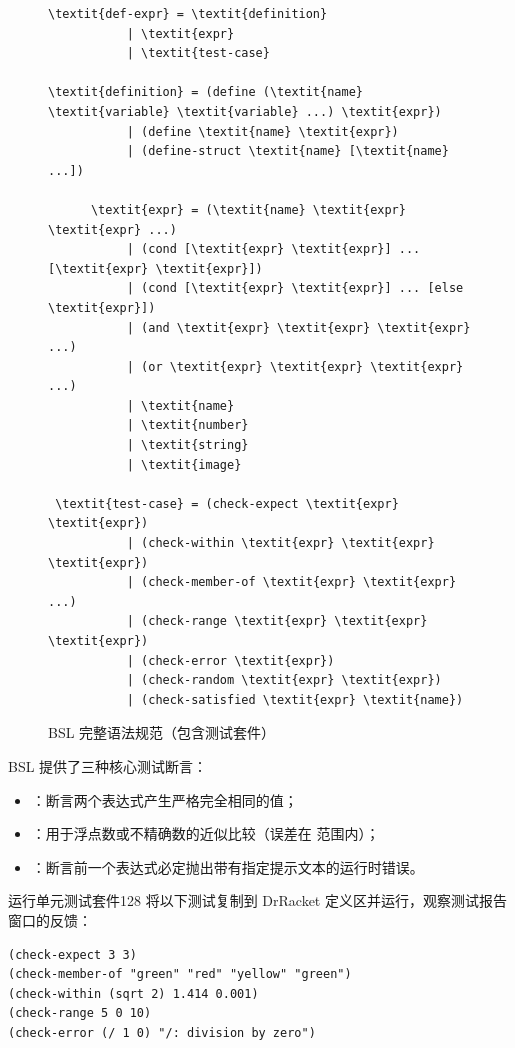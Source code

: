 \begin{figure}[htbp]
  \centering
\begin{stepperbox}[unbreakable]
\begin{Verbatim}[commandchars=\\\{\}, fontsize=\scriptsize]
  \textit{def-expr} = \textit{definition}
           | \textit{expr}
           | \textit{test-case}

\textit{definition} = (define (\textit{name} \textit{variable} \textit{variable} ...) \textit{expr})
           | (define \textit{name} \textit{expr})
           | (define-struct \textit{name} [\textit{name} ...])

      \textit{expr} = (\textit{name} \textit{expr} \textit{expr} ...)
           | (cond [\textit{expr} \textit{expr}] ... [\textit{expr} \textit{expr}])
           | (cond [\textit{expr} \textit{expr}] ... [else \textit{expr}])
           | (and \textit{expr} \textit{expr} \textit{expr} ...)
           | (or \textit{expr} \textit{expr} \textit{expr} ...)
           | \textit{name}
           | \textit{number}
           | \textit{string}
           | \textit{image}

 \textit{test-case} = (check-expect \textit{expr} \textit{expr})
           | (check-within \textit{expr} \textit{expr} \textit{expr})
           | (check-member-of \textit{expr} \textit{expr} ...)
           | (check-range \textit{expr} \textit{expr} \textit{expr})
           | (check-error \textit{expr})
           | (check-random \textit{expr} \textit{expr})
           | (check-satisfied \textit{expr} \textit{name})
\end{Verbatim}
\end{stepperbox}
  \caption{BSL 完整语法规范（包含测试套件）}
  \label{fig:bsl_full_grammar}
\end{figure}

BSL 提供了三种核心测试断言：
\begin{itemize}
  \item {}：断言两个表达式产生严格完全相同的值；
  \item {}：用于浮点数或不精确数的近似比较（误差在  范围内）；
  \item {}：断言前一个表达式必定抛出带有指定提示文本的运行时错误。
\end{itemize}

\begin{exercise}{运行单元测试套件}{128}
将以下测试复制到 DrRacket 定义区并运行，观察测试报告窗口的反馈：
\begin{lstlisting}[language=BSL]
(check-expect 3 3)
(check-member-of "green" "red" "yellow" "green")
(check-within (sqrt 2) 1.414 0.001)
(check-range 5 0 10)
(check-error (/ 1 0) "/: division by zero")
\end{lstlisting}
\end{exercise}

